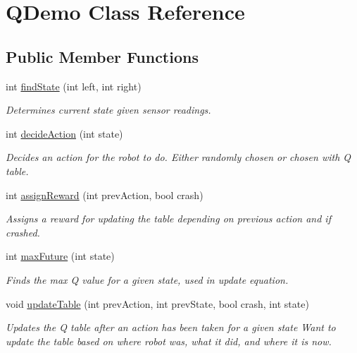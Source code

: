 \hypertarget{classQDemo}{\section{Q\-Demo Class Reference}
\label{classQDemo}
}
\subsection*{Public Member Functions}
\begin{DoxyCompactItemize}
\item 
int \hyperlink{classQDemo_a2ca217e625c266c533948a11d3a82cb0}{find\-State} (int left, int right)
\begin{DoxyCompactList}\small\item\em Determines current state given sensor readings. \end{DoxyCompactList}\item 
int \hyperlink{classQDemo_a01e5738762f8ccad91006485989407aa}{decide\-Action} (int state)
\begin{DoxyCompactList}\small\item\em Decides an action for the robot to do. Either randomly chosen or chosen with Q table. \end{DoxyCompactList}\item 
int \hyperlink{classQDemo_a24a1516efe8f30a114980935581c1f7c}{assign\-Reward} (int prev\-Action, bool crash)
\begin{DoxyCompactList}\small\item\em Assigns a reward for updating the table depending on previous action and if crashed. \end{DoxyCompactList}\item 
int \hyperlink{classQDemo_ae5a2b3f86e18c70bd949a62a221725bb}{max\-Future} (int state)
\begin{DoxyCompactList}\small\item\em Finds the max Q value for a given state, used in update equation. \end{DoxyCompactList}\item 
void \hyperlink{classQDemo_ab0045aa791d191c4fa80e4070b242ae7}{update\-Table} (int prev\-Action, int prev\-State, bool crash, int state)
\begin{DoxyCompactList}\small\item\em Updates the Q table after an action has been taken for a given state Want to update the table based on where robot was, what it did, and where it is now. \end{DoxyCompactList}\item 

\end{DoxyCompactItemize}
